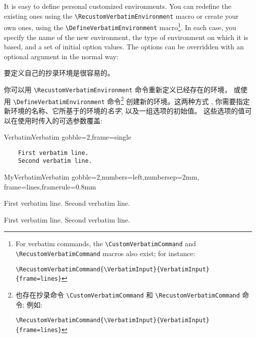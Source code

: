 \documentclass[twoside]{article}
\newif\ifChangeBar \ChangeBarfalse
\newcommand\cs[1]{\texttt{\textbackslash#1}}
\newcommand\verbatimTxt{抄录}
\begin{document}
\ifChangeBar\begin{changebar}\fi
\VerbatimFootnotes

  It is easy to define personal customized environments. You can redefine
the existing ones using the \cs{RecustomVerbatimEnvironment} macro or create
your own ones, using the \cs{DefineVerbatimEnvironment} macro\footnote{%
\ifChangeBar\begin{changebar}\fi
For verbatim commands, the \cs{CustomVerbatimCommand} and
\cs{RecustomVerbatimCommand} macros also exist; for instance:

\noindent
\verb+\RecustomVerbatimCommand{\VerbatimInput}{VerbatimInput}{frame=lines}+
\ifChangeBar\end{changebar}\fi}.
In each case, you specify the name of the new environment, the type of
environment on which it is based, and a set of initial option values. The
options can be overridden with an optional argument in the normal way:

要定义自己的{\verbatimTxt}环境是很容易的。 
  
你可以用 \cs{RecustomVerbatimEnvironment} 命令重新定义已经存在的环境，
或使用 \cs{DefineVerbatimEnvironment} 命令\footnote{%
  \ifChangeBar\begin{changebar}\fi
    也存在{\verbatimTxt}命令 \cs{CustomVerbatimCommand} 和
  \cs{RecustomVerbatimCommand} 命令; 例如:
  
  \noindent
  \verb+\RecustomVerbatimCommand{\VerbatimInput}{VerbatimInput}{frame=lines}+
  \ifChangeBar\end{changebar}\fi} 创建新的环境。这两种方式
, 你需要指定新环境的名称、它所基于的环境的{\em 名字},  
以及一组选项的初始值。 
这些选项的值可以在使用时传入的可选参数覆盖:



\begin{SideBySideExample}
  \RecustomVerbatimEnvironment
    {Verbatim}{Verbatim}
    {gobble=2,frame=single}
  \begin{Verbatim}
    First verbatim line.
    Second verbatim line.
  \end{Verbatim}
\end{SideBySideExample}
\ifChangeBar\end{changebar}\fi

\begin{SideBySideExample}
  \DefineVerbatimEnvironment%
    {MyVerbatim}{Verbatim}
    {gobble=2,numbers=left,numbersep=2mm,
     frame=lines,framerule=0.8mm}
  \begin{MyVerbatim}
    First verbatim line.
    Second verbatim line.
  \end{MyVerbatim}

  \begin{MyVerbatim}[numbers=none,
                     framerule=1pt]
    First verbatim line.
    Second verbatim line.
  \end{MyVerbatim}
\end{SideBySideExample}
\end{document}
